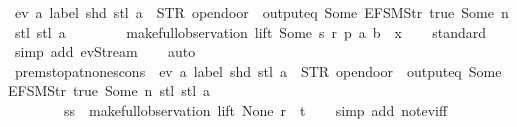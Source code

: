 \begin{isabellebody}
\ ev\ {\isacharparenleft}{\isasymlambda}a{\isachardot}\ label\ {\isacharparenleft}shd\ {\isacharparenleft}stl\ a{\isacharparenright}{\isacharparenright}\ {\isacharequal}\ STR\ {\isacharprime}{\isacharprime}opendoor{\isacharprime}{\isacharprime}\ {\isasymand}\ output{\isacharunderscore}eq\ {\isacharbrackleft}Some\ {\isacharparenleft}EFSM{\isachardot}Str\ {\isacharprime}{\isacharprime}true{\isacharprime}{\isacharprime}{\isacharparenright}{\isacharcomma}\ Some\ n{\isacharbrackright}\ {\isacharparenleft}stl\ {\isacharparenleft}stl\ a{\isacharparenright}{\isacharparenright}{\isacharparenright}\isanewline
\ \ \ \ \ \ \ \ {\isacharparenleft}make{\isacharunderscore}full{\isacharunderscore}observation\ lift\ {\isacharparenleft}Some\ s{\isacharprime}{\isacharparenright}\ r{\isacharprime}\ p{\isacharprime}\ {\isacharparenleft}{\isacharparenleft}a{\isacharcomma}\ b{\isacharparenright}\ {\isacharhash}{\isacharhash}\ x{}{\isacharparenright}{\isacharparenright}{\isachardoublequoteclose}\isanewline
%
\isadelimproof
\ \ %
\endisadelimproof
%
\isatagproof
{}\isamarkupfalse%
\ standard\isanewline
\ \ \ \isamarkupfalse%
\ {\isacharparenleft}simp\ add{\isacharcolon}\ ev{\isacharunderscore}Stream{\isacharparenright}\isanewline
\ \ \isamarkupfalse%
\ auto%
\endisatagproof
{\isafoldproof}%
%
\isadelimproof
\isanewline
%
\endisadelimproof
\isanewline
{}\isamarkupfalse%
\ prem{\isacharunderscore}stop{\isacharunderscore}at{\isacharunderscore}none{\isacharunderscore}scons{\isacharcolon}\ {\isachardoublequoteopen}{\isasymnot}\ ev\ {\isacharparenleft}{\isasymlambda}a{\isachardot}\ label\ {\isacharparenleft}shd\ {\isacharparenleft}stl\ a{\isacharparenright}{\isacharparenright}\ {\isacharequal}\ STR\ {\isacharprime}{\isacharprime}opendoor{\isacharprime}{\isacharprime}\ {\isasymand}\ output{\isacharunderscore}eq\ {\isacharbrackleft}Some\ {\isacharparenleft}EFSM{\isachardot}Str\ {\isacharprime}{\isacharprime}true{\isacharprime}{\isacharprime}{\isacharparenright}{\isacharcomma}\ Some\ n{\isacharbrackright}\ {\isacharparenleft}stl\ {\isacharparenleft}stl\ a{\isacharparenright}{\isacharparenright}{\isacharparenright}\isanewline
\ \ \ \ \ \ \ \ {\isacharparenleft}ss\ {\isacharhash}{\isacharhash}\ make{\isacharunderscore}full{\isacharunderscore}observation\ lift\ None\ r\ {\isacharbrackleft}{\isacharbrackright}\ t{\isacharparenright}{\isachardoublequoteclose}\isanewline
%
\isadelimproof
\ \ %
\endisadelimproof
%
\isatagproof
{}\isamarkupfalse%
\ {\isacharparenleft}simp\ add{\isacharcolon}\ not{\isacharunderscore}ev{\isacharunderscore}iff{\isacharparenright}\isanewline

\end{isabellebody}

